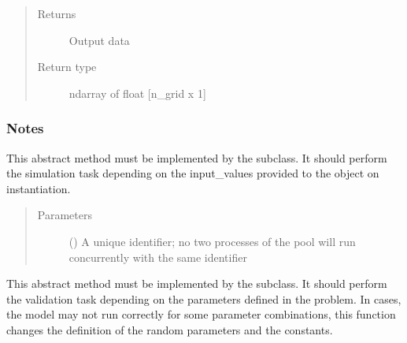 \documentclass[letterpaper,10pt,english,openany,oneside]{sphinxmanual}
\begin{document}
\begin{fulllineitems}
\begin{quote}
\begin{description}
\item[{Returns}] \leavevmode
{} \textendash{} Output data

\item[{Return type}] \leavevmode
ndarray of float {[}n\_grid x 1{]}

\end{description}\end{quote}
\subsubsection*{Notes}

\begin{figure}[htbp]
\centering

\noindent{}
\end{figure}

\begin{fulllineitems}
\label{\detokenize{pygpc.testfunctions:pygpc.testfunctions.testfunctions.HyperbolicTangent.simulate}}
This abstract method must be implemented by the subclass.
It should perform the simulation task depending on the input\_values provided to the object on instantiation.
\begin{quote}\begin{description}
\item[{Parameters}] \leavevmode
{} () \textendash{} A unique identifier; no two processes of the pool will run concurrently with the same identifier

\end{description}\end{quote}

\end{fulllineitems}


\begin{fulllineitems}
\label{\detokenize{pygpc.testfunctions:pygpc.testfunctions.testfunctions.HyperbolicTangent.validate}}
This abstract method must be implemented by the subclass.
It should perform the validation task depending on the parameters defined in the problem.
In cases, the model may not run correctly for some parameter combinations, this function changes the definition
of the random parameters and the constants.

\end{fulllineitems}


\end{fulllineitems}
\end{document}
